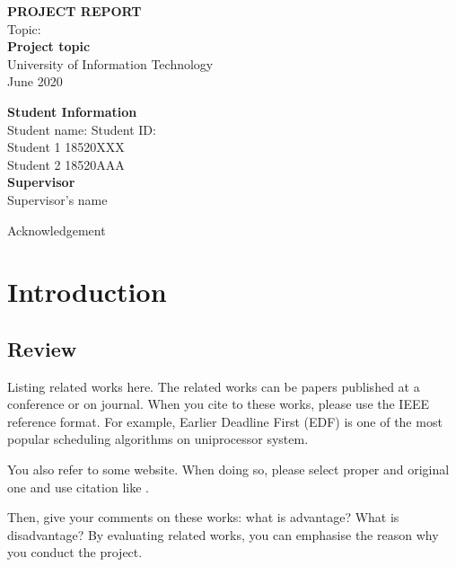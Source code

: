 \documentclass[12pt]{report}
\newcommand\tab[1][1cm]{\hspace*{#1}}
\begin{document}
\thispagestyle{empty}
\begin{center}

	\vspace*{3cm}
	{\bf \LARGE PROJECT REPORT}\\
	\vspace*{2cm}
	Topic:\\
	{\bf \Large Project topic}\\
	\vspace{3cm}
	{\Large University of Information Technology}\\
	\vspace{5cm}
	{\Large June 2020}
\end{center}

\newpage
\vspace*{5cm}
\begin{center}
	{\bf \Large Student Information}\\
	Student name: \tab Student ID:\\
	Student 1 \tab 18520XXX\\
	Student 2 \tab 18520AAA\\
	\vspace{5cm}
	{\bf \Large Supervisor}\\
	Supervisor's name
\end{center}

\newpage
 {Acknowledgement}

\tableofcontents
\listoffigures
\listoftables
\chapter{Introduction}
\section{Review}
Listing related works here.
The related works can be papers published at a conference or on journal.
When you cite to these works,
please use the IEEE reference format.
For example,
Earlier Deadline First (EDF) \cite{ref10} is one of the most popular scheduling algorithms on uniprocessor system.

You also refer to some website.
When doing so,
please select proper and original one and use citation like \cite{ref1}.


Then, give your comments on these works: what is advantage? What is disadvantage?
By evaluating related works,
you can emphasise the reason why you conduct the project.
\end{document}
